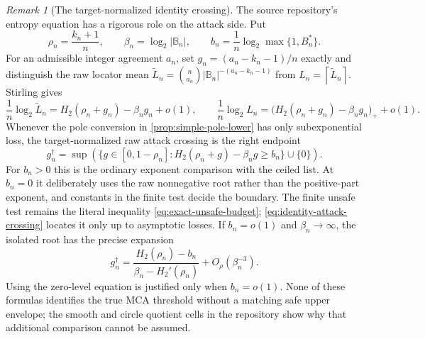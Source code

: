 \documentclass[11pt,a4paper]{amsart}
\numberwithin{equation}{section}
\theoremstyle{remark}
\newtheorem{remark}[remark]{Remark}
\newcommand{\B}{\mathbb B}
\newcommand{\abs}[1]{\lvert #1\rvert}
\newcommand{\ceil}[1]{\left\lceil #1\right\rceil}
\begin{document}
\begin{remark}[The target-normalized identity crossing]
\label{rem:target-normalized-identity-crossing}
The source repository's entropy equation \cite{RSMCARepo} has a rigorous
role on the attack side.
Put
\[
 \rho_n=\frac{k_n+1}{n},\qquad
 \beta_n=\log_2\abs{\B_n},\qquad
 b_n=\frac1n\log_2\max\{1,B_n^*\}.
\]
For an admissible integer agreement \(a_n\), set
\(g_n=(a_n-k_n-1)/n\) exactly and distinguish the raw locator mean
\(\widetilde L_n=\binom n{a_n}\abs{\B_n}^{-(a_n-k_n-1)}\) from
\(L_n=\ceil{\widetilde L_n}\).  Stirling gives
\[
 \frac1n\log_2\widetilde L_n
 =H_2(\rho_n+g_n)-\beta_ng_n+o(1),\qquad
 \frac1n\log_2L_n
 =\bigl(H_2(\rho_n+g_n)-\beta_ng_n\bigr)_++o(1).  \tag{IC1}
 \label{eq:identity-attack-exponent}
\]
Whenever the pole conversion in \cref{prop:simple-pole-lower} has only
subexponential loss, the target-normalized raw attack crossing is the
right endpoint
\[
 g_n^\dagger=\sup\left(\{g\in[0,1-\rho_n]:
 H_2(\rho_n+g)-\beta_ng\ge b_n\}\cup\{0\}\right). \tag{IC2}
 \label{eq:identity-attack-crossing}
\]
For \(b_n>0\) this is the ordinary exponent comparison with the ceiled
list.  At \(b_n=0\) it deliberately uses the raw nonnegative root rather
than the positive-part exponent, and constants in the finite test decide
the boundary.
The finite unsafe test remains the literal inequality
\eqref{eq:exact-unsafe-budget}; \eqref{eq:identity-attack-crossing}
locates it only up to asymptotic losses.  If \(b_n=o(1)\) and
\(\beta_n\to\infty\), the isolated root has the precise expansion
\[
 g_n^\dagger=
 \frac{H_2(\rho_n)-b_n}{\beta_n-H_2'(\rho_n)}
 +O_\rho(\beta_n^{-3}).                            \tag{IC3}
 \label{eq:identity-attack-expansion}
\]
Using the zero-level equation is justified only when \(b_n=o(1)\).
None of these formulas identifies the true MCA threshold without a
matching safe upper envelope; the smooth and circle quotient cells in the
repository show why that additional comparison cannot be assumed.
\end{remark}
\end{document}
